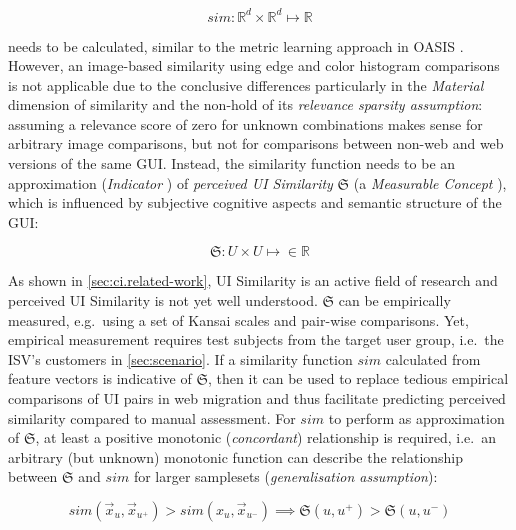 \begin{equation}sim: \mathbb{R}^d \times \mathbb{R}^d \mapsto \mathbb{R}\label{eq:sim}\end{equation}

needs to be calculated, similar to the metric learning approach in OASIS \autocite{Chechik2010OASIS}.
However, an image-based similarity using edge and color histogram comparisons \autocite{Chechik2010OASIS} is not applicable due to the conclusive differences particularly in the \emph{Material} dimension of similarity and the non-hold of its \emph{relevance sparsity assumption}: assuming a relevance score of zero for unknown combinations makes sense for arbitrary image comparisons, but not for comparisons between non-web and web versions of the same GUI.
Instead, the similarity function needs to be an approximation (\emph{Indicator} \autocite{ISO/IEEE2017Measurement}) of \emph{perceived UI Similarity} \(\mathfrak{S}\) (a \emph{Measurable Concept} \autocite{ISO/IEEE2017Measurement}), which is influenced by subjective cognitive aspects \autocite{Bakaev2017Kansei} and semantic structure of the GUI:

\begin{equation}\mathfrak{S}: U \times U \mapsto \in \mathbb{R}\label{eq:perceived-sim}\end{equation}

As shown in \cref{sec:ci.related-work}, UI Similarity is an active field of research and perceived UI Similarity is not yet well understood.
\(\mathfrak{S}\) can be empirically measured, e.g.~using a set of Kansai scales \autocite{Bakaev2017Kansei} and pair-wise comparisons.
Yet, empirical measurement requires test subjects from the target user group, i.e.~the ISV's customers in \cref{sec:scenario}.
If a similarity function \(sim\) calculated from feature vectors is indicative of \(\mathfrak{S}\), then it can be used to replace tedious empirical comparisons of UI pairs in web migration and thus facilitate predicting perceived similarity compared to manual assessment.
For \(sim\) to perform as approximation of \(\mathfrak{S}\), at least a positive monotonic (\emph{concordant}) relationship is required, i.e.~an arbitrary (but unknown) monotonic function can describe the relationship between \(\mathfrak{S}\) and \(sim\) for larger samplesets (\emph{generalisation assumption}):

\begin{equation}sim(\vec x_u, \vec x_{u^+}) > sim(x_u, \vec x_{u^-}) \implies \mathfrak{S}(u, u^+) > \mathfrak{S}(u, u^-)\label{eq:sim-assumption}\end{equation}

